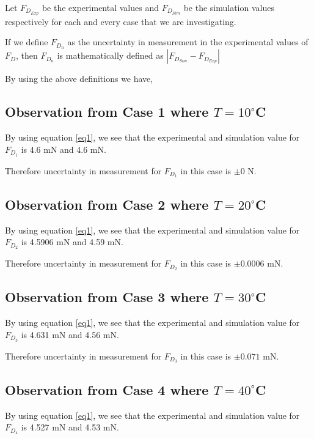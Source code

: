 {Let $F_{{D}_{Exp}}$ be the experimental values and $F_{{D}_{Sim}}$ be the simulation values respectively for each and every case that we are investigating.} 

{If we define $F_{D_n}$ as the uncertainty in measurement in the experimental values of $F_D$, then $F_{D_n}$ is mathematically defined as $\left| F_{{D}_{Sim}} - F_{{D}_{Exp}} \right|$}

{By using the above definitions we have,}

\subsection{{Observation from Case 1 where $T = 10^\circ$C}}

	{By using equation \ref{eq1}, we see that the experimental and simulation value for $F_{D_1}$ is 4.6 mN and 4.6 mN.}
        
	{Therefore uncertainty in measurement for $F_{D_1}$ in this case is $\pm{\textit{0}}$ N.}        
        
\subsection{{Observation from Case 2 where $T = 20^\circ$C}}

	{By using equation \ref{eq1}, we see that the experimental and simulation value for $F_{D_2}$ is 4.5906 mN and 4.59 mN.}
        
	{Therefore uncertainty in measurement for $F_{D_2}$ in this case is $\pm{\textit{0.0006}}$ mN.}        
        
\subsection{{Observation from Case 3 where $T = 30^\circ$C}}

	{By using equation \ref{eq1}, we see that the experimental and simulation value for $F_{D_3}$ is 4.631 mN and 4.56 mN.}
        
	{Therefore uncertainty in measurement for $F_{D_3}$ in this case is $\pm{\textit{0.071}}$ mN.}        
        
\subsection{{Observation from Case 4 where $T = 40^\circ$C}}
        
	{By using equation \ref{eq1}, we see that the experimental and simulation value for $F_{D_4}$ is 4.527 mN and 4.53 mN.}
        
